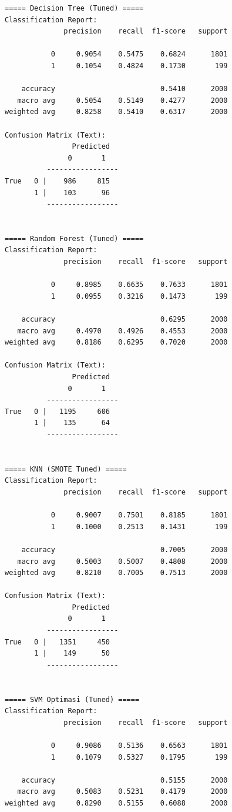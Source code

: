 \begin{lstlisting}[caption={Output 2}]
===== Decision Tree (Tuned) =====
Classification Report:
              precision    recall  f1-score   support

           0     0.9054    0.5475    0.6824      1801
           1     0.1054    0.4824    0.1730       199

    accuracy                         0.5410      2000
   macro avg     0.5054    0.5149    0.4277      2000
weighted avg     0.8258    0.5410    0.6317      2000

Confusion Matrix (Text):
                Predicted
               0       1
          -----------------
True   0 |    986     815
       1 |    103      96
          -----------------


===== Random Forest (Tuned) =====
Classification Report:
              precision    recall  f1-score   support

           0     0.8985    0.6635    0.7633      1801
           1     0.0955    0.3216    0.1473       199

    accuracy                         0.6295      2000
   macro avg     0.4970    0.4926    0.4553      2000
weighted avg     0.8186    0.6295    0.7020      2000

Confusion Matrix (Text):
                Predicted
               0       1
          -----------------
True   0 |   1195     606
       1 |    135      64
          -----------------


===== KNN (SMOTE Tuned) =====
Classification Report:
              precision    recall  f1-score   support

           0     0.9007    0.7501    0.8185      1801
           1     0.1000    0.2513    0.1431       199

    accuracy                         0.7005      2000
   macro avg     0.5003    0.5007    0.4808      2000
weighted avg     0.8210    0.7005    0.7513      2000

Confusion Matrix (Text):
                Predicted
               0       1
          -----------------
True   0 |   1351     450
       1 |    149      50
          -----------------


===== SVM Optimasi (Tuned) =====
Classification Report:
              precision    recall  f1-score   support

           0     0.9086    0.5136    0.6563      1801
           1     0.1079    0.5327    0.1795       199

    accuracy                         0.5155      2000
   macro avg     0.5083    0.5231    0.4179      2000
weighted avg     0.8290    0.5155    0.6088      2000


\end{lstlisting}
